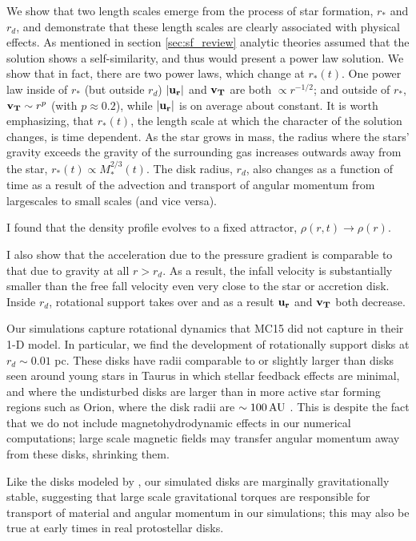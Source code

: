 \documentclass[../dissertation.tex]{subfiles}
\begin{document}
We show that two length scales emerge from the process of star formation, $r_*$ and $r_d$, and demonstrate
that these length scales are clearly associated with physical effects. 
As mentioned in section \ref{sec:sf_review} analytic theories assumed that the solution shows a self-similarity, and thus would present a power law solution.
We show that in fact, there are two power laws, which change at $r_*(t)$. 
One power law inside of $r_*$ (but outside $r_d$) $|\mathbf{u_r}|$ and  $\mathbf{v_T}$ are both
$\propto r^{-1/2}$; and outside of $r_*$, $\mathbf{v_T} \sim r^{p}$ (with $p\approx0.2$), while $|\mathbf{u_r}|$ 
is on average about constant. 
It is worth emphasizing, that $r_*(t)$, the length scale at which the character of the solution changes, is time dependent. 
As the star grows in mass, the radius where the stars' gravity exceeds the gravity of the surrounding gas increases outwards away from the star, 
$r_*(t) \propto M_*^{2/3}(t)$.
The disk radius, $r_d$, also changes as a function of time as a result of the advection and transport of angular momentum from largescales to small scales (and vice versa).

I found that the density profile evolves to a fixed attractor, $\rho(r,t ) \rightarrow \rho(r)$. 

I also show that the acceleration due to the pressure gradient is comparable to that due to gravity at all $r>r_d$. 
As a result, the infall velocity is substantially smaller than the free fall velocity
even very close to the star or accretion disk. 
Inside $r_d$, rotational support takes over and as a result $\mathbf{u_r}$ and $\mathbf{v_T}$ both decrease.  

Our simulations capture rotational dynamics that MC15 did not capture in their 1-D model.  
In particular, we find the development of rotationally support disks at $r_d \sim 0.01$ pc.  
These disks have radii comparable to  or slightly larger than disks seen around 
young stars in Taurus \citep{1999AJ....117.1490P} in which stellar feedback effects are minimal,
and where the undisturbed disks are larger than in more active star forming regions such as Orion, 
where the disk radii are $\sim 100\,\rm AU$ \citep{2011ARA&A..49...67W}.  
This is despite the fact that we do not include magnetohydrodynamic effects 
in our numerical computations;  large scale magnetic fields may transfer angular 
momentum away from these disks, shrinking them.  

Like the disks modeled by \citet{2010ApJ...708.1585K},
our simulated disks are 
marginally gravitationally stable, suggesting that large scale gravitational torques are 
responsible for transport of material and angular momentum in our simulations; this may
also be true at early times in real protostellar disks.  
\end{document}
